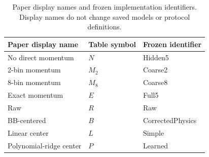 \begin{table}[!htbp]
\centering\small
\caption{Paper display names and frozen implementation identifiers. Display names do not change saved models or protocol definitions.}
\label{tab:editorial-display-names}
\begin{tabular}{lll}
\toprule Paper display name & Table symbol & Frozen identifier\\
\midrule
No direct momentum & $N$ & Hidden5\\
2-bin momentum & $M_2$ & Coarse2\\
8-bin momentum & $M_8$ & Coarse8\\
Exact momentum & $E$ & Full5\\
Raw & $R$ & Raw\\
BB-centered & $B$ & CorrectedPhysics\\
Linear center & $L$ & Simple\\
Polynomial-ridge center & $P$ & Learned\\
\bottomrule
\end{tabular}
\end{table}
